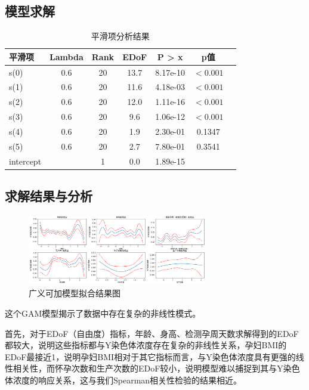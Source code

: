 \documentclass[withoutpreface,notoc]{cumcmthesis}
\begin{document}
	\subsection{模型求解}

	\begin{table}[H]
	\centering
	\caption{平滑项分析结果}
	\label{tab:smooth_terms}
		\begin{tabular}{lcccccc}
		\toprule
		平滑项 & Lambda & Rank & EDoF & P > x & p值 \\
		\midrule
		s(0) & 0.6 & 20 & 13.7 & 8.17e-10 & $<0.001$ \\
		s(1) & 0.6 & 20 & 11.6 & 4.18e-03 & $<0.001$ \\
		s(2) & 0.6 & 20 & 12.0 & 1.11e-16 & $<0.001$ \\
		s(3) & 0.6 & 20 & 9.6 & 1.06e-12 & $<0.001$ \\
		s(4) & 0.6 & 20 & 1.9 & 2.30e-01 & 0.1347 \\
		s(5) & 0.6 & 20 & 2.7 & 7.80e-01 & 0.3541 \\
		intercept & & 1 & 0.0 & 1.89e-15 &      \\
		\bottomrule
		\end{tabular}
	\end{table}





	
	
	

	
	\subsection{求解结果与分析}
	
	\begin{figure}[ht]
		\centering
		\includegraphics[width=0.7\textwidth]{figures/广义可加结果.png} 
		\caption{广义可加模型拟合结果图}
		\label{广义可加结果}
	\end{figure}

	这个GAM模型揭示了数据中存在复杂的非线性模式。
	
	首先，对于EDoF（自由度）指标，年龄、身高、检测孕周天数求解得到的EDoF都较大，说明这些指标都与Y染色体浓度存在复杂的非线性关系，孕妇BMI的EDoF最接近1，说明孕妇BMI相对于其它指标而言，与Y染色体浓度具有更强的线性相关性，而怀孕次数和生产次数的EDoF较小，说明模型难以捕捉到其与Y染色体浓度的响应关系，这与我们Spearman相关性检验的结果相近。
\end{document}

